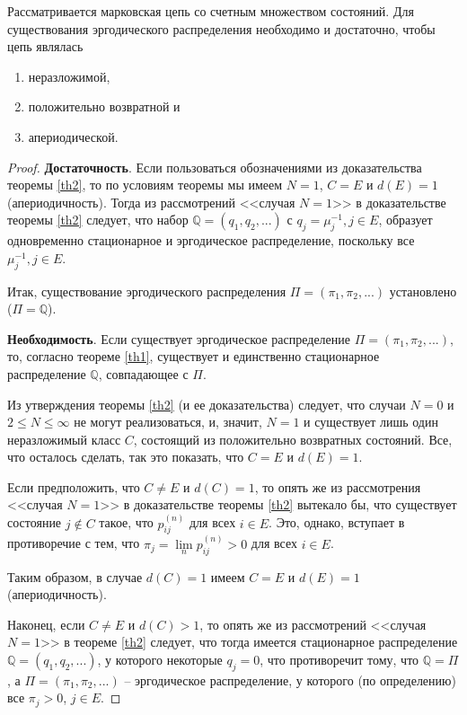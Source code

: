 \begin{theorem}\label{th3}
Рассматривается марковская цепь со счетным множеством состояний. Для существования эргодического распределения необходимо и достаточно, чтобы цепь являлась
\begin{enumerate}[label=(\alph*)]
    \item неразложимой,
    \item положительно возвратной и
    \item апериодической.
\end{enumerate}

\begin{proof}

\textbf{Достаточность}. Если пользоваться обозначениями из доказательства теоремы \ref{th2}, то по условиям теоремы мы имеем $N = 1$, $C = E$ и $d(E) = 1$ (апериодичность). Тогда из рассмотрений <<случая $N = 1$>> в доказательстве теоремы \ref{th2} следует, что набор $\mathbb{Q} = (q_1, q_2, ...)$ с $q_j = \mu_j^{-1}, j \in E$, образует одновременно стационарное и эргодическое распределение, поскольку все $\mu_j^{-1}, j \in E$.

Итак, существование эргодического распределения $\Pi = (\pi_1, \pi_2, ...)$ установлено ($\Pi = \mathbb{Q}$).

\textbf{Необходимость}. Если существует эргодическое распределение $\Pi = (\pi_1, \pi_2, ...)$, то, согласно теореме \ref{th1}, существует и единственно  стационарное распределение $\mathbb{Q}$, совпадающее с $\Pi$.

Из утверждения теоремы \ref{th2} (и ее доказательства) следует, что случаи $N = 0$ и $2 \leq N \leq \infty$ не могут реализоваться, и, значит, $N = 1$ и существует лишь один неразложимый класс $C$, состоящий из положительно возвратных состояний. Все, что осталось сделать, так это показать, что $C = E$ и $d(E) = 1$.

Если предположить, что $C \neq E$ и $d(C) = 1$, то опять же из рассмотрения <<случая $N = 1$>> в доказательстве теоремы \ref{th2} вытекало бы, что существует состояние $j \notin C$ такое, что $p_{ij}^{(n)}$ для всех $i \in E$. Это, однако, вступает в противоречие с тем, что $\pi_j = \lim\limits_n p_{ij}^{(n)} > 0$ для всех $i \in E$.

Таким образом, в случае $d(C) = 1$ имеем $C = E$ и $d(E) = 1$ (апериодичность).

Наконец, если $C \neq E$ и $d(C) > 1$, то опять же из рассмотрений <<случая $N = 1$>> в теореме \ref{th2} следует, что тогда имеется стационарное распределение $\mathbb{Q} = (q_1, q_2, ...)$, у которого некоторые $q_j= 0$, что противоречит тому, что $\mathbb{Q} = \Pi$, а $\Pi = (\pi_1, \pi_2, ...)$ -- эргодическое распределение, у которого (по определению) все $\pi_j > 0$, $j \in E$.

\end{proof}
\end{theorem}


